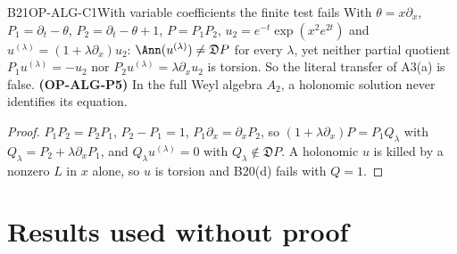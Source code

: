 \begin{dimcard}{B21}{OP-ALG-C1}{With variable coefficients the finite test fails}{\pw}{}
With $\theta=x\partial_x$, $P_1=\partial_t-\theta$, $P_2=\partial_t-\theta+1$, $P=P_1P_2$, $u_2=e^{-t}\exp(x^2e^{2t})$ and $u^{(\lambda)}=(1+\lambda\partial_x)u_2$: $\Ann(u^{(\lambda)})\ne\mathfrak DP$ for every $\lambda$, yet neither partial quotient $P_1u^{(\lambda)}=-u_2$ nor $P_2u^{(\lambda)}=\lambda\partial_xu_2$ is torsion. So the literal transfer of A3(a) is false. \textbf{(OP-ALG-P5)} In the full Weyl algebra $A_2$, a holonomic solution never identifies its equation.
\end{dimcard}
\begin{proof}
$P_1P_2=P_2P_1$, $P_2-P_1=1$, $P_1\partial_x=\partial_xP_2$, so $(1+\lambda\partial_x)P=P_1Q_\lambda$ with $Q_\lambda=P_2+\lambda\partial_xP_1$, and $Q_\lambda u^{(\lambda)}=0$ with $Q_\lambda\notin\mathfrak DP$.
A holonomic $u$ is killed by a nonzero $L$ in $x$ alone, so $u$ is torsion and B20(d) fails with $Q=1$.
\end{proof}

\section{Results used without proof}

